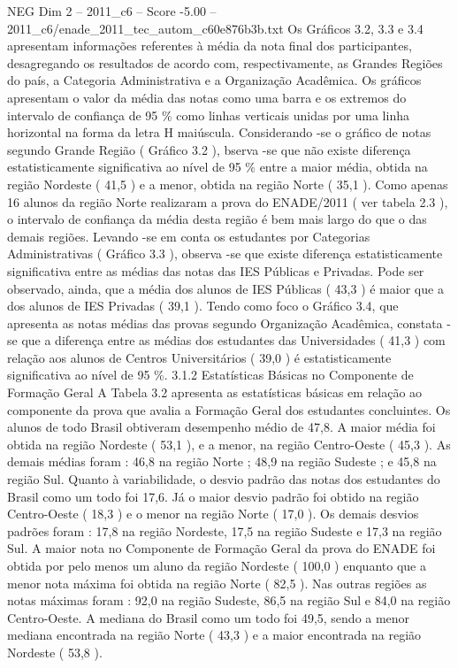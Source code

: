 \begin{textsample}{NEG Dim 2 – 2011\_c6 – Score -5.00 – 2011\_c6/enade\_2011\_tec\_autom\_c60e876b3b.txt}
Os Gráficos 3.2, 3.3 e 3.4 apresentam informações referentes à média da nota final dos participantes, desagregando os resultados de acordo com, respectivamente, as Grandes Regiões do país, a Categoria Administrativa e a Organização Acadêmica.
Os gráficos apresentam o valor da média das notas como uma barra e os extremos do intervalo de confiança de 95 \% como linhas verticais unidas por uma linha horizontal na forma da letra H maiúscula.
Considerando -se o gráfico de notas segundo Grande Região ( Gráfico 3.2 ), bserva -se que não existe diferença estatisticamente significativa ao nível de 95 \% entre a maior média, obtida na região Nordeste ( 41,5 ) e a menor, obtida na região Norte ( 35,1 ).
Como apenas 16 alunos da região Norte realizaram a prova do ENADE/2011 ( ver tabela 2.3 ), o intervalo de confiança da média desta região é bem mais largo do que o das demais regiões.
Levando -se em conta os estudantes por Categorias Administrativas ( Gráfico 3.3 ), observa -se que existe diferença estatisticamente significativa entre as médias das notas das IES Públicas e Privadas.
Pode ser observado, ainda, que a média dos alunos de IES Públicas ( 43,3 ) é maior que a dos alunos de IES Privadas ( 39,1 ).
Tendo como foco o Gráfico 3.4, que apresenta as notas médias das provas segundo Organização Acadêmica, constata -se que a diferença entre as médias dos estudantes das Universidades ( 41,3 ) com relação aos alunos de Centros Universitários ( 39,0 ) é estatisticamente significativa ao nível de 95 \%. 3.1.2 Estatísticas Básicas no Componente de Formação Geral A Tabela 3.2 apresenta as estatísticas básicas em relação ao componente da prova que avalia a Formação Geral dos estudantes concluintes.
Os alunos de todo Brasil obtiveram desempenho médio de 47,8.
A maior média foi obtida na região Nordeste ( 53,1 ), e a menor, na região Centro-Oeste ( 45,3 ).
As demais médias foram : 46,8 na região Norte ; 48,9 na região Sudeste ; e 45,8 na região Sul.
Quanto à variabilidade, o desvio padrão das notas dos estudantes do Brasil como um todo foi 17,6.
Já o maior desvio padrão foi obtido na região Centro-Oeste ( 18,3 ) e o menor na região Norte ( 17,0 ).
Os demais desvios padrões foram : 17,8 na região Nordeste, 17,5 na região Sudeste e 17,3 na região Sul.
A maior nota no Componente de Formação Geral da prova do ENADE foi obtida por pelo menos um aluno da região Nordeste ( 100,0 ) enquanto que a menor nota máxima foi obtida na região Norte ( 82,5 ).
Nas outras regiões as notas máximas foram : 92,0 na região Sudeste, 86,5 na região Sul e 84,0 na região Centro-Oeste.
A mediana do Brasil como um todo foi 49,5, sendo a menor mediana encontrada na região Norte ( 43,3 ) e a maior encontrada na região Nordeste ( 53,8 ).

\end{textsample}
